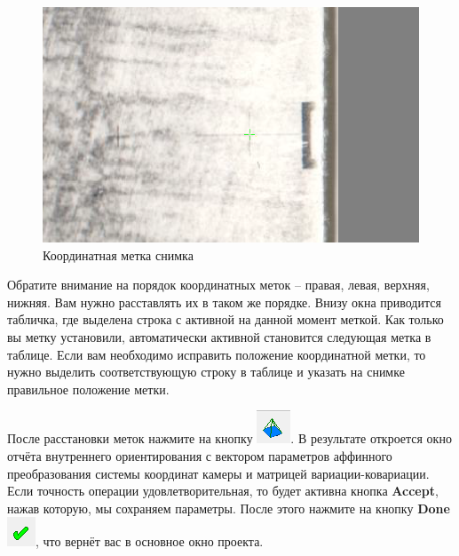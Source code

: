 \documentclass[
  12pt,
]{book}
\begin{document}
\begin{figure}
\centering
\includegraphics{images/Ref13/Mark.png}
\caption{Координатная метка снимка}
\end{figure}

Обратите внимание на порядок координатных меток -- правая, левая, верхняя, нижняя. Вам нужно расставлять их в таком же порядке. Внизу окна приводится табличка, где выделена строка с активной на данной момент меткой. Как только вы метку установили, автоматически активной становится следующая метка в таблице. Если вам необходимо исправить положение координатной метки, то нужно выделить соответствующую строку в таблице и указать на снимке правильное положение метки.

После расстановки меток нажмите на кнопку \includegraphics{images/Ref13/Execute_IO.png}. В результате откроется окно отчёта внутреннего ориентирования с вектором параметров аффинного преобразования системы координат камеры и матрицей вариации-ковариации. Если точность операции удовлетворительная, то будет активна кнопка \textbf{Accept}, нажав которую, мы сохраняем параметры. После этого нажмите на кнопку \textbf{Done} \includegraphics{images/Ref13/Done.png}, что вернёт вас в основное окно проекта.
\end{document}
